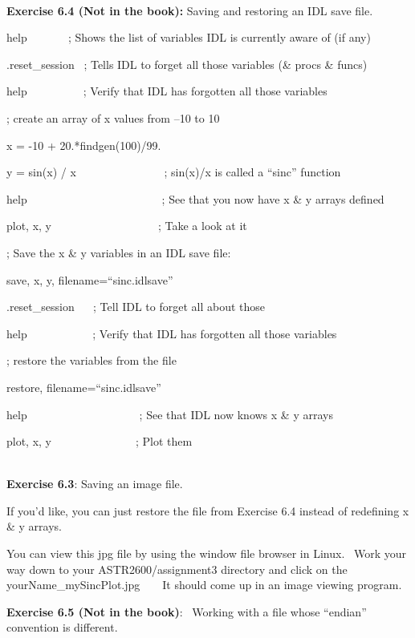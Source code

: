 \documentclass{article}
\begin{document}
\begin{spacing}{1.0}
\textbf{}\\

\textbf{Exercise 6.4 (Not in the book):} Saving and restoring an IDL
save file.


help ~ ~ ~ ~ ; Shows the list of variables IDL is currently aware of (if
any)

.reset\_session~ ; Tells IDL to forget all those variables (\& procs \&
funcs)

help~ ~ ~ ~ ~ ~ ; Verify that IDL has forgotten all those variables


; create an array of x values from --10 to 10

x = -10 + 20.*findgen(100)/99.

y = sin(x) / x ~ ~ ~ ~ ~ ~ ~ ~ ~ ; sin(x)/x is called a ``sinc''
function

help ~ ~ ~ ~ ~ ~ ~ ~ ~ ~ ~ ~ ~ ~ ; See that you now have x \& y arrays
defined

plot, x, y ~ ~ ~ ~ ~ ~ ~ ~ ~ ~ ~ ; Take a look at it


; Save the x \& y variables in an IDL save file:

save, x, y, filename=``sinc.idlsave''


.reset\_session~ ~ ; Tell IDL to forget all about those

help~ ~ ~ ~ ~ ~ ~ ; Verify that IDL has forgotten all those variables



; restore the variables from the file

restore, filename=``sinc.idlsave''

help~ ~ ~ ~ ~ ~ ~ ~ ~ ~ ~ ~ ; See that IDL now knows x \& y arrays

plot, x, y~ ~ ~ ~ ~ ~ ~ ~ ~ ; Plot them


\textbf{}\\

\textbf{Exercise 6.3}: Saving an image file. ~

If you'd like, you can just restore the file from Exercise 6.4 instead
of redefining x \& y arrays.

You can view this jpg file by using the window file browser in Linux.~
Work your way down to your ASTR2600/assignment3 directory and click on
the yourName\_mySincPlot.jpg ~ ~ It should come up in an image viewing
program.





\textbf{Exercise 6.5 (Not in the book)}:~ Working with a file whose
``endian'' convention is different.


\end{spacing}
\end{document}
